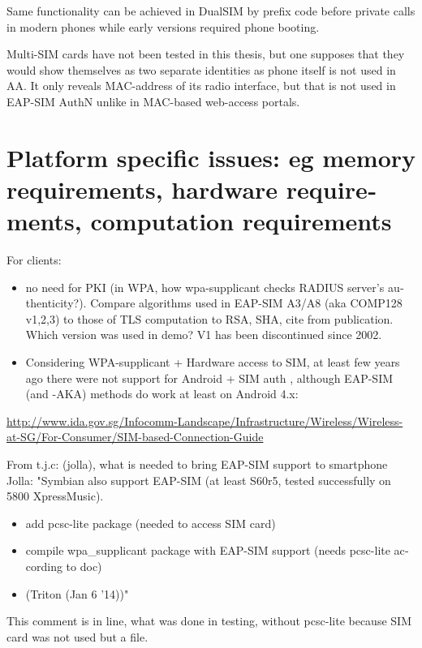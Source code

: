 \documentclass[12pt,a4paper,english]{tutthesis}
\begin{document}
\begin{otherlanguage}{english}
Same functionality can be achieved in DualSIM by prefix code before
private calls in modern phones while early versions required 
phone booting.

Multi-SIM cards have not been tested in this thesis, but one supposes
that they would show themselves as two separate identities as 
phone itself is not used in AA. It only reveals  MAC-address of its
radio interface, but that is not used in EAP-SIM AuthN unlike in MAC-based web-access portals.


\section{Platform specific issues: eg memory requirements, hardware requirements, computation requirements}
\label{sec-6-3}

For clients: 
\begin{itemize}
\item no need for PKI (in WPA, how wpa-supplicant checks RADIUS server's
authenticity?). Compare algorithms used in EAP-SIM A3/A8 (aka
COMP128 v1,2,3) to those of
TLS computation to RSA, SHA, cite from publication.
Which version was used in demo? V1 has been discontinued since 2002.

\item Considering WPA-supplicant + Hardware access to SIM,
at least few years ago there were not support for Android + SIM
auth \cite{android-sim}, although EAP-SIM (and -AKA) methods do
work at least on Android 4.x:
\end{itemize}
\url{http://www.ida.gov.sg/Infocomm-Landscape/Infrastructure/Wireless/Wireless-at-SG/For-Consumer/SIM-based-Connection-Guide}


From t.j.c: (jolla), what is needed to bring EAP-SIM support
to smartphone Jolla:
"Symbian also support EAP-SIM (at least S60r5, tested successfully on 5800 XpressMusic).

\begin{itemize}
\item add pcsc-lite package (needed to access SIM card)
\item compile wpa\_supplicant package with EAP-SIM support (needs pcsc-lite according to doc)
\item{}
(Triton (Jan 6 '14))"
\end{itemize}

This comment is in line, what was done in testing, without pcsc-lite
because SIM card was not used but a file.


\end{otherlanguage}
\end{document}
